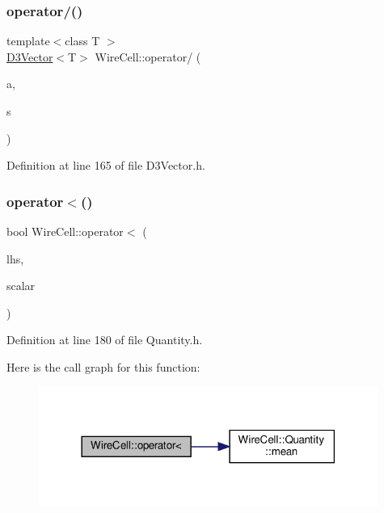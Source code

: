 \subsubsection{\texorpdfstring{operator/()}{operator/()}\hspace{0.1cm}{\footnotesize\ttfamily [3/3]}}
{\footnotesize\ttfamily template$<$class T $>$ \\
\hyperlink{class_wire_cell_1_1_d3_vector}{D3\+Vector}$<$T$>$ Wire\+Cell\+::operator/ (\begin{DoxyParamCaption}\item[{const \hyperlink{class_wire_cell_1_1_d3_vector}{D3\+Vector}$<$ T $>$}]{a,  }\item[{T}]{s }\end{DoxyParamCaption})}



Definition at line 165 of file D3\+Vector.\+h.

\mbox{\label{namespace_wire_cell_a82ae32e730a05ffdcc611b09d72076fe}} 
\subsubsection{\texorpdfstring{operator$<$()}{operator<()}\hspace{0.1cm}{\footnotesize\ttfamily [1/2]}}
{\footnotesize\ttfamily bool Wire\+Cell\+::operator$<$ (\begin{DoxyParamCaption}\item[{const \hyperlink{class_wire_cell_1_1_quantity}{Wire\+Cell\+::\+Quantity} \&}]{lhs,  }\item[{const double \&}]{scalar }\end{DoxyParamCaption})\hspace{0.3cm}{\ttfamily [inline]}}



Definition at line 180 of file Quantity.\+h.

Here is the call graph for this function\+:
\nopagebreak
\begin{figure}[H]
\begin{center}
\leavevmode
\includegraphics[width=314pt]{namespace_wire_cell_a82ae32e730a05ffdcc611b09d72076fe_cgraph}
\end{center}
\end{figure}
\mbox{\label{namespace_wire_cell_a143feb235cfb5761b0691c4d1c129ca3}} 
